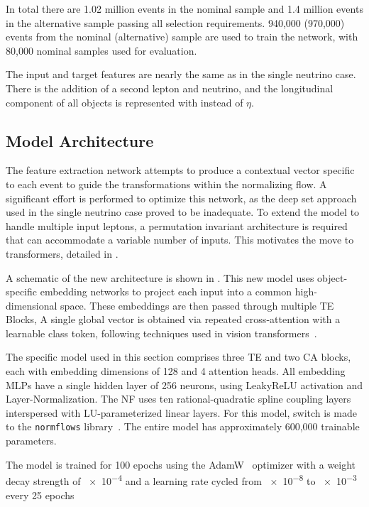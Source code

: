 In total there are 1.02 million events in the nominal sample and 1.4 million events in the alternative sample passing all selection requirements.
940,000 (970,000) events from the nominal (alternative) sample are used to train the network, with 80,000 nominal samples used for evaluation.

The input and target features are nearly the same as in the single neutrino case.
There is the addition of a second lepton and neutrino, and the longitudinal component of all objects is represented with \pz instead of $\eta$.

\subsection{Model Architecture}

The feature extraction network attempts to produce a contextual vector specific to each event to guide the transformations within the normalizing flow.
A significant effort is performed to optimize this network, as the deep set approach used in the single neutrino case proved to be inadequate.
To extend the model to handle multiple input leptons, a permutation invariant architecture is required that can accommodate a variable number of inputs.
This motivates the move to transformers, detailed in .

A schematic of the new \vvflows architecture is shown in .
This new model uses object-specific embedding networks to project each input into a common high-dimensional space.
These embeddings are then passed through multiple TE Blocks,
A single global vector is obtained via repeated cross-attention with a learnable class token, following techniques used in vision transformers~\cite{GoingDeeper}.

The specific model used in this section comprises three TE and two CA blocks, each with embedding dimensions of 128 and 4 attention heads.
All embedding MLPs have a single hidden layer of 256 neurons, using LeakyReLU activation and Layer-Normalization.
The NF uses ten rational-quadratic spline coupling layers interspersed with LU-parameterized linear layers.
For this model, switch is made to the \texttt{normflows} library~\cite{Stimper2023}.
The entire \vvflows model has approximately 600,000 trainable parameters.

The model is trained for 100 epochs using the AdamW~\cite{AdamW} optimizer with a weight decay strength of \num{e-4} and a learning rate cycled from \num{e-8} to \num{e-3} every 25 epochs

